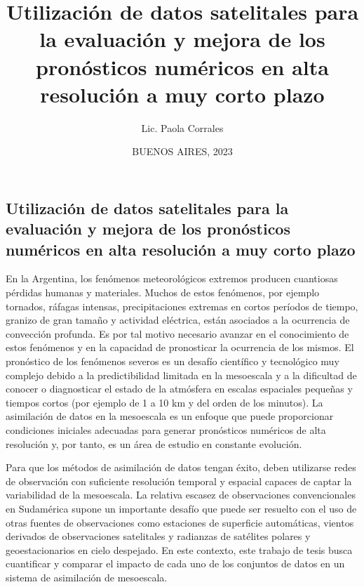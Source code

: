 \documentclass[12pt,oneside,a4paper]{reedthesis}
\title{Utilización de datos satelitales para la evaluación y mejora de los pronósticos numéricos en alta resolución a muy corto plazo}
\author{Lic. Paola Corrales}
\date{BUENOS AIRES, 2023}
\begin{document}
  \maketitle

\frontmatter %
\pagestyle{empty} %
  \begin{resumen}
    \hypertarget{utilizaciuxf3n-de-datos-satelitales-para-la-evaluaciuxf3n-y-mejora-de-los-pronuxf3sticos-numuxe9ricos-en-alta-resoluciuxf3n-a-muy-corto-plazo}{%
    \section*{Utilización de datos satelitales para la evaluación y mejora de los pronósticos numéricos en alta resolución a muy corto plazo}\label{utilizaciuxf3n-de-datos-satelitales-para-la-evaluaciuxf3n-y-mejora-de-los-pronuxf3sticos-numuxe9ricos-en-alta-resoluciuxf3n-a-muy-corto-plazo}}
    
    En la Argentina, los fenómenos meteorológicos extremos producen cuantiosas pérdidas humanas y materiales. Muchos de estos fenómenos, por ejemplo tornados, ráfagas intensas, precipitaciones extremas en cortos períodos de tiempo, granizo de gran tamaño y actividad eléctrica, están asociados a la ocurrencia de convección profunda. Es por tal motivo necesario avanzar en el conocimiento de estos fenómenos y en la capacidad de pronosticar la ocurrencia de los mismos. El pronóstico de los fenómenos severos es un desafío científico y tecnológico muy complejo debido a la predictibilidad limitada en la mesoescala y a la dificultad de conocer o diagnosticar el estado de la atmósfera en escalas espaciales pequeñas y tiempos cortos (por ejemplo de 1 a 10 km y del orden de los minutos). La asimilación de datos en la mesoescala es un enfoque que puede proporcionar condiciones iniciales adecuadas para generar pronósticos numéricos de alta resolución y, por tanto, es un área de estudio en constante evolución.
    
    Para que los métodos de asimilación de datos tengan éxito, deben utilizarse redes de observación con suficiente resolución temporal y espacial capaces de captar la variabilidad de la mesoescala. La relativa escasez de observaciones convencionales en Sudamérica supone un importante desafío que puede ser resuelto con el uso de otras fuentes de observaciones como estaciones de superficie automáticas, vientos derivados de observaciones satelitales y radianzas de satélites polares y geoestacionarios en cielo despejado. En este contexto, este trabajo de tesis busca cuantificar y comparar el impacto de cada uno de los conjuntos de datos en un sistema de asimilación de mesoescala.
    

\end{resumen}
\end{document}
